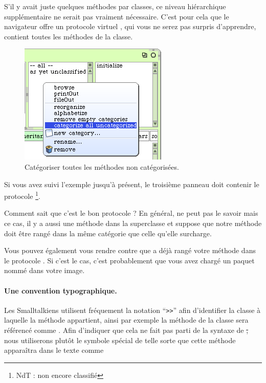 \documentclass[a4paper,10pt,twoside]{book}
\begin{document}
S'il y avait juste quelques méthodes par classes, ce niveau hiérarchique supplémentaire ne serait pas vraiment nécessaire.
C'est pour cela que le navigateur offre un protocole virtuel , qui vous ne serez pas surpris d'apprendre, contient toutes les méthodes de la classe.

\begin{figure}[htbp]
   \centering
   \includegraphics[scale=0.7]{Categorize} 
   \caption{Catégoriser toutes les méthodes non catégorisées.\label{fig:categorize}}
\end{figure}

Si vous avez suivi l'exemple jusqu'à présent, le troisième panneau doit contenir le protocole \footnote{NdT : non encore classifié}.

Comment \squeak{} sait que c'est le bon protocole ? En général, \squeak{} ne peut pas le savoir mais ce cas, il y a aussi une méthode  dans la superclasse et \squeak suppose que notre méthode  doit être rangé dans la même catégorie que celle qu'elle surcharge.

Vous pouvez également vous rendre contre que \squeak a déjà rangé votre méthode  dans le protocole . Si c'est le cas, c'est probablement que vous avez chargé un paquet nommé  dans votre image.

\paragraph{Une convention typographique.} Les Smalltalkiens utilisent fréquement la notation ``\verb|>>|'' afin d'identifier la classe à laquelle la méthode appartient, ainsi par exemple la méthode  de la classe  sera référencé comme .
Afin d'indiquer que cela ne fait pas parti de la syntaxe de \st, nous utiliserons plutôt le symbole spécial \ct{>>>} de telle sorte que cette méthode apparaîtra dans le texte comme 
\end{document}
